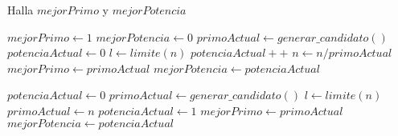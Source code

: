 \begin{algorithm}
\caption{Halla $mejorPrimo$ y $mejorPotencia$}
\begin{algorithmic}[1]
\STATE $mejorPrimo \leftarrow 1$
\STATE $mejorPotencia \leftarrow 0$
\STATE $primoActual \leftarrow generar\_candidato()$
\STATE $potenciaActual \leftarrow 0$
\STATE $l \leftarrow limite(n)$
        \STATE $potenciaActual++$
        \STATE $n \leftarrow n/primoActual$
    \ELSE
            \STATE $mejorPrimo \leftarrow primoActual$
            \STATE $mejorPotencia \leftarrow potenciaActual$
        \ENDIF

        \STATE $potenciaActual \leftarrow 0$
        \STATE $primoActual \leftarrow generar\_candidato()$
        \STATE $l \leftarrow limite(n)$
    \ENDIF
\ENDWHILE
{}
    \STATE $primoActual \leftarrow n$
    \STATE $potenciaActual \leftarrow 1$
\ENDIF
{}
    \STATE $mejorPrimo \leftarrow primoActual$
    \STATE $mejorPotencia \leftarrow potenciaActual$
\ENDIF
\end{algorithmic}
\end{algorithm}
